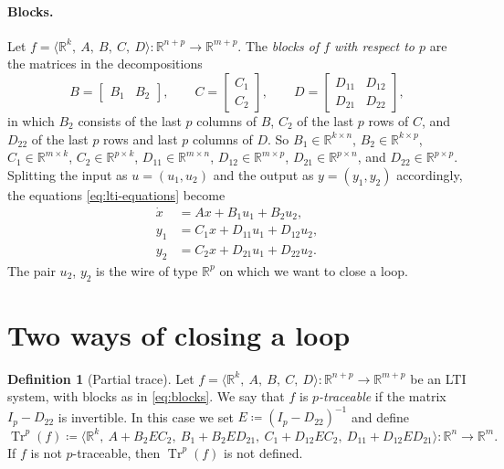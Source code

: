 \documentclass[11pt,a4paper]{article}
\theoremstyle{plain}
\theoremstyle{definition}
\newtheorem{definition}[theorem]{Definition}
\theoremstyle{remark}
\DeclareMathOperator{\Tr}{Tr}
\newcommand{\R}{\mathbb{R}}
\newcommand{\sys}[5]{\bigl\langle #1,\ #2,\ #3,\ #4,\ #5 \bigr\rangle}
\begin{document}
\paragraph{Blocks.}
Let $f = \sys{\R^k}{A}{B}{C}{D} \colon \R^{n+p} \to \R^{m+p}$.
The \emph{blocks of $f$ with respect to $p$} are the matrices in the decompositions
\begin{equation}
    \label{eq:blocks}
    B = \begin{bmatrix} B_1 & B_2 \end{bmatrix},
    \qquad
    C = \begin{bmatrix} C_1 \\ C_2 \end{bmatrix},
    \qquad
    D = \begin{bmatrix} D_{11} & D_{12} \\ D_{21} & D_{22} \end{bmatrix},
\end{equation}
in which $B_2$ consists of the last $p$ columns of $B$, $C_2$ of the last $p$ rows of $C$, and $D_{22}$ of the last $p$ rows and last $p$ columns of $D$.
So $B_1 \in \R^{k \times n}$, $B_2 \in \R^{k \times p}$, $C_1 \in \R^{m \times k}$, $C_2 \in \R^{p \times k}$, $D_{11} \in \R^{m \times n}$, $D_{12} \in \R^{m \times p}$, $D_{21} \in \R^{p \times n}$, and $D_{22} \in \R^{p \times p}$.
Splitting the input as $u = (u_1, u_2)$ and the output as $y = (y_1, y_2)$ accordingly, the equations \cref{eq:lti-equations} become
\begin{equation}
    \label{eq:lti-equations-blocks}
    \begin{aligned}
        \dot x & = A x + B_1 u_1 + B_2 u_2, \\
        y_1    & = C_1 x + D_{11} u_1 + D_{12} u_2, \\
        y_2    & = C_2 x + D_{21} u_1 + D_{22} u_2 .
    \end{aligned}
\end{equation}
The pair $u_2$, $y_2$ is the wire of type $\R^p$ on which we want to close a loop.

\section{Two ways of closing a loop}

\begin{definition}[Partial trace]
    \label{def:tr}
    Let $f = \sys{\R^k}{A}{B}{C}{D} \colon \R^{n+p} \to \R^{m+p}$ be an LTI system, with blocks as in \cref{eq:blocks}.
    We say that $f$ is \emph{$p$-traceable} if the matrix $I_p - D_{22}$ is invertible.
    In this case we set $E \coloneqq (I_p - D_{22})^{-1}$ and define
    \begin{equation}
        \label{eq:tr}
        \Tr^p(f) \coloneqq \sys{\R^k}
        {A + B_2 E C_2}
        {B_1 + B_2 E D_{21}}
        {C_1 + D_{12} E C_2}
        {D_{11} + D_{12} E D_{21}}
        \colon \R^n \to \R^m .
    \end{equation}
    If $f$ is not $p$-traceable, then $\Tr^p(f)$ is not defined.
\end{definition}
\end{document}
